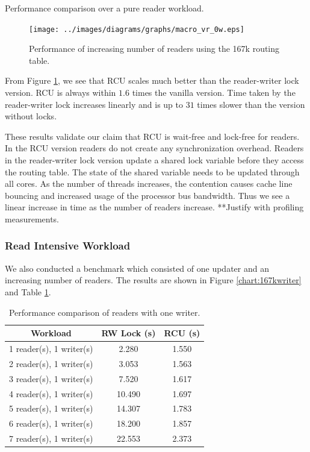 \documentclass{article}
\begin{document}
\begin{table}[tph]
\begin{center}

\end{center}
\caption{Performance comparison over a pure reader workload.}
\label{tbl:167kreader}
\end{table}

\begin{figure}[tph]
\texttt{[image: ../images/diagrams/graphs/macro\_vr\_0w.eps]}
\caption{Performance of increasing number of readers using the 167k routing table.}
\label{chart:167kreader}
\end{figure}

From Figure \ref{chart:167kreader}, we see that RCU scales much better
than the reader-writer lock version. RCU is always within $1.6$ times
the vanilla version. Time taken by the reader-writer lock increases
linearly and is up to $31$ times slower than the version without
locks.

These results validate our claim that RCU is wait-free and lock-free
for readers. In the RCU version readers do not create any
synchronization overhead. Readers in the reader-writer lock version
update a shared lock variable before they access the routing
table. The state of the shared variable needs to be updated through
all cores. As the number of threads increases, the contention causes
cache line bouncing and increased usage of the processor bus
bandwidth. Thus we see a linear increase in time as the number of
readers increase. **Justify with profiling measurements.

\subsubsection{Read Intensive Workload}
We also conducted a benchmark which consisted of one updater and an
increasing number of readers. The results are shown in Figure
\ref{chart:167kwriter} and Table \ref{tbl:167kwriter}.

\begin{table}[tph]
\begin{center}
\begin{tabular}{|c|c|c|}
\hline Workload & RW Lock (s) & RCU (s) \\
\hline 1 reader(s), 1 writer(s) & 2.280 & 1.550\\
\hline 2 reader(s), 1 writer(s) & 3.053 & 1.563\\
\hline 3 reader(s), 1 writer(s) & 7.520 & 1.617\\
\hline 4 reader(s), 1 writer(s) & 10.490 & 1.697\\
\hline 5 reader(s), 1 writer(s) & 14.307 & 1.783\\
\hline 6 reader(s), 1 writer(s) & 18.200 & 1.857\\
\hline 7 reader(s), 1 writer(s) & 22.553 & 2.373\\
\hline
\end{tabular}
\end{center}
\caption{Performance comparison of readers with one writer.}
\label{tbl:167kwriter}
\end{table}
\end{document}
